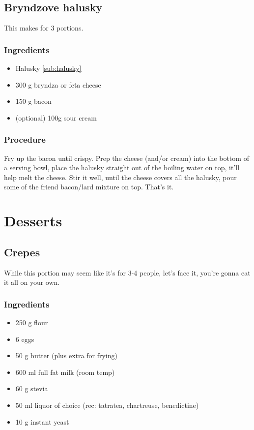 \documentclass[10pt]{article}
\begin{document}
\subsection{Bryndzove halusky}%
This makes for 3 portions.
\label{sub:bryndzove_halusky}
\subsubsection{Ingredients}%
\label{ssub:bryndzove_halusky_ingredients}
\begin{itemize}
	\item Halusky \ref{sub:halusky}
	\item 300 g bryndza or feta cheese
	\item 150 g bacon 
	\item (optional) 100g sour cream
\end{itemize}
\subsubsection{Procedure}%
\label{ssub:bryndzove_halusky_procedure}
Fry up the bacon until crispy. Prep the cheese (and/or cream) into the bottom of a serving bowl, place the halusky straight out of the boiling water on top, it'll help melt the cheese. Stir it well, until the cheese covers all the halusky, pour some of the friend bacon/lard mixture on top. That's it.


\section{Desserts}%
\label{sec:desserts}

\subsection{Crepes}%
\label{sub:crepes}

While this portion may seem like it's for 3-4 people, let's face it, you're gonna eat it all on your own.

\subsubsection{Ingredients}%
\label{ssub:crepes_ingredients}
\begin{itemize}
	\item 250 g flour
	\item 6 eggs
	\item 50 g butter (plus extra for frying)
	\item 600 ml full fat milk (room temp)
	\item 60 g stevia
	\item 50 ml liquor of choice (rec: tatratea, chartreuse, benedictine)
	\item 10 g instant yeast
\end{itemize}
\end{document}

